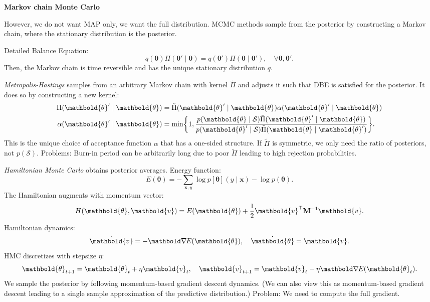 \documentclass[10pt]{article}
\newenvironment{topic}[1]
{\textbf{\sffamily \footnotesize \colorbox{black}{\rlap{\textbf{\textcolor{white}{#1}}}\hspace{\linewidth}\hspace{-2\fboxsep}}}}
{}
\newenvironment{subtopic}[1]
{\begin{center}\textbf{\footnotesize \sffamily #1}\end{center}}
{}
\renewcommand{\mat}[1]{\ensuremath{\mathbf{#1}}}
\renewcommand{\vec}[1]{\ensuremath{\mathbold{#1}}}
\begin{document}
\begin{multicols*}{3}
\begin{topic}{Bayesian learning}
        \begin{subtopic}{Markov chain Monte Carlo}
            However, we do not want MAP only, we want the full distribution. MCMC methods sample from
            the posterior by constructing a Markov chain, where the stationary distribution is the
            posterior.

            Detailed Balance Equation: \[
                q(\vec{\theta}) \Pi(\vec{\theta}' \mid \vec{\theta}) = q(\vec{\theta}') \Pi(\vec{\theta} \mid \vec{\theta}'), \quad \forall \vec{\theta}, \vec{\theta}'.
            \]
            Then, the Markov chain is time reversible and has the unique stationary distribution $q$.

            \textit{Metropolis-Hastings} samples from an arbitrary Markov chain with kernel $\tilde{\Pi}$ and adjusts it
            such that DBE is satisfied for the posterior. It does so by constructing a new kernel:
            \begin{align*}
                \Pi(\vec{\theta}' \mid \vec{\theta})    & = \tilde{\Pi}(\vec{\theta}' \mid \vec{\theta}) \alpha(\vec{\theta}' \mid \vec{\theta})                                                                                                        \\
                \alpha(\vec{\theta}' \mid \vec{\theta}) & = \min \lft\{ 1, \frac{p(\vec{\theta} \mid \mathcal{S}) \tilde{\Pi}(\vec{\theta}' \mid \vec{\theta})}{p(\vec{\theta}' \mid \mathcal{S}) \tilde{\Pi}(\vec{\theta} \mid \vec{\theta}')} \rgt\}.
            \end{align*}
            This is the unique choice of acceptance function $\alpha$ that has a one-sided structure. If $\tilde{\Pi}$ is
            symmetric, we only need the ratio of posteriors, not $p(\mathcal{S})$. Problems: Burn-in
            period can be arbitrarily long due to poor $\tilde{\Pi}$ leading to high rejection
            probabilities.

            \textit{Hamiltonian Monte Carlo} obtains posterior averages. Energy function: \[
                E(\vec{\theta}) = - \sum_{\vec{x},y} \log p[\vec{\theta}](y \mid \vec{x}) - \log p(\vec{\theta}).
            \]
            The Hamiltonian augments with momentum vector: \[
                H(\vec{\theta}, \vec{v}) = E(\vec{\theta}) + \frac{1}{2} \transpose{\vec{v}} \inv{\mat{M}} \vec{v}.
            \]
            Hamiltonian dynamics: \[
                \dot{\vec{v}} = -\grad{E(\vec{\theta})}{}, \quad \dot{\vec{\theta}} = \vec{v}.
            \]
            HMC discretizes with stepsize $\eta$: \[
                \vec{\theta}_{t+1} = \vec{\theta}_t + \eta \vec{v}_t, \quad \vec{v}_{t+1} = \vec{v}_t - \eta \grad{E(\vec{\theta}_t)}{}.
            \]
            We sample the posterior by following momentum-based gradient descent dynamics. (We can also view
            this as momentum-based gradient descent leading to a single sample approximation of the predictive
            distribution.) Problem: We need to compute the full gradient.


\end{subtopic}
\end{topic}
\end{multicols*}
\end{document}
